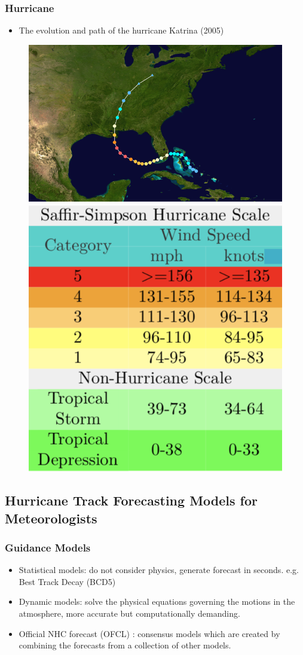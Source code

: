 \documentclass{beamer}
\begin{document}
\begin{frame}
\frametitle{Hurricane}
\begin{itemize}
	\item The evolution and path of the hurricane Katrina (2005) \\
\end{itemize}
\begin{figure}
	\includegraphics[width=0.6\linewidth, height=0.6\textheight]{figs/Katrina.png}
	\includegraphics[width=0.3\linewidth, height=0.4\textheight]{figs/saffir-simpson.png}
\end{figure}
\end{frame}



\subsection{Hurricane Track Forecasting Models for Meteorologists }



\begin{frame}
\frametitle{Guidance Models}
\begin{itemize}
	\item Statistical models: do not consider physics, generate forecast in seconds. e.g. Best Track Decay (BCD5)
	\item Dynamic models: solve the physical equations governing the motions in the atmosphere, more accurate but computationally demanding. 
	\item Official NHC forecast (OFCL) :  consensus models which are created by combining the forecasts from a collection of other models.
\end{itemize}
\end{frame}
 
\end{document}

